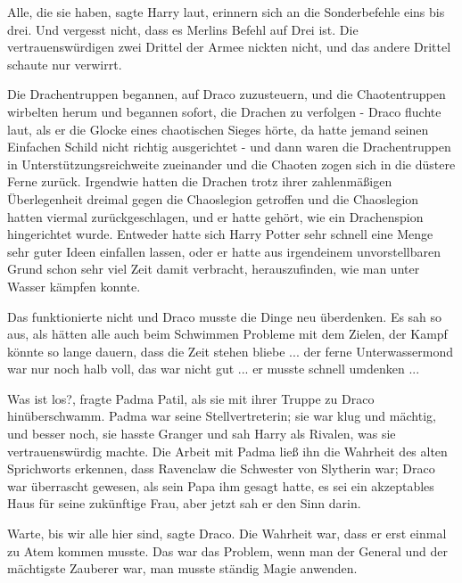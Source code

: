 \glqq{}Alle, die sie haben\grqq{}, sagte Harry laut, \glqq{}erinnern sich an die
Sonderbefehle eins bis drei. Und vergesst nicht, dass es Merlins Befehl auf Drei
ist. \glqq{}Die vertrauenswürdigen zwei Drittel der Armee nickten nicht, und das
andere Drittel schaute nur verwirrt.\grqq{}

Die Drachentruppen begannen, auf Draco zuzusteuern, und die Chaotentruppen
wirbelten herum und begannen sofort, die Drachen zu verfolgen - Draco fluchte
laut, als er die Glocke eines chaotischen Sieges hörte, da hatte jemand seinen
Einfachen Schild nicht richtig ausgerichtet - und dann waren die Drachentruppen
in Unterstützungsreichweite zueinander und die Chaoten zogen sich in die düstere
Ferne zurück. Irgendwie hatten die Drachen trotz ihrer zahlenmäßigen
Überlegenheit dreimal gegen die Chaoslegion getroffen und die Chaoslegion hatten
viermal zurückgeschlagen, und er hatte gehört, wie ein Drachenspion hingerichtet
wurde. Entweder hatte sich Harry Potter sehr schnell eine Menge sehr guter Ideen
einfallen lassen, oder er hatte aus irgendeinem unvorstellbaren Grund schon sehr
viel Zeit damit verbracht, herauszufinden, wie man unter Wasser kämpfen konnte.

Das funktionierte nicht und Draco musste die Dinge neu überdenken. Es sah so
aus, als hätten alle auch beim Schwimmen Probleme mit dem Zielen, der Kampf
könnte so lange dauern, dass die Zeit stehen bliebe ... der ferne Unterwassermond
war nur noch halb voll, das war nicht gut ... er musste schnell umdenken ...

\glqq{}Was ist los?\grqq{}, fragte Padma Patil, als sie mit ihrer Truppe zu Draco
hinüberschwamm. Padma war seine Stellvertreterin; sie war klug und mächtig, und
besser noch, sie hasste Granger und sah Harry als Rivalen, was sie
vertrauenswürdig machte. Die Arbeit mit Padma ließ ihn die Wahrheit des alten
Sprichworts erkennen, dass Ravenclaw die Schwester von Slytherin war; Draco war
überrascht gewesen, als sein Papa ihm gesagt hatte, es sei ein akzeptables Haus
für seine zukünftige Frau, aber jetzt sah er den Sinn darin.

\glqq{}Warte, bis wir alle hier sind\grqq{}, sagte Draco. Die Wahrheit war, dass
er erst einmal zu Atem kommen musste. Das war das Problem, wenn man der General
und der mächtigste Zauberer war, man musste ständig Magie anwenden.

